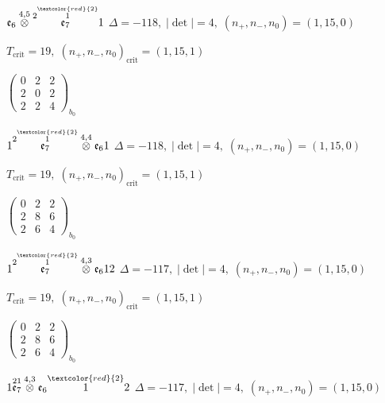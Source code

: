 \documentclass[10pt]{article}
\begin{document}
$\mathfrak{e}_6\overset{4,5}{\otimes}\overset{2\overset{\textcolor{red}{2}}{1}}{\mathfrak{e}_7}1$ \quad $\Delta=-118,\; |\det|=4,\; (n_+,n_-,n_0)=(1,15,0)$

\hspace{1em}$T_{\text{crit}}=19,\; (n_+,n_-,n_0)_{\text{crit}}=(1,15,1)$

\hspace{2em}$\left(\begin{smallmatrix}0 & 2 & 2 \\ 2 & 0 & 2 \\ 2 & 2 & 4\end{smallmatrix}\right)_{\!b_0}$

\smallskip

$1\overset{2\overset{\textcolor{red}{2}}{1}}{\mathfrak{e}_7}\overset{4,4}{\otimes}\mathfrak{e}_61$ \quad $\Delta=-118,\; |\det|=4,\; (n_+,n_-,n_0)=(1,15,0)$

\hspace{1em}$T_{\text{crit}}=19,\; (n_+,n_-,n_0)_{\text{crit}}=(1,15,1)$

\hspace{2em}$\left(\begin{smallmatrix}0 & 2 & 2 \\ 2 & 8 & 6 \\ 2 & 6 & 4\end{smallmatrix}\right)_{\!b_0}$

\smallskip

$1\overset{2\overset{\textcolor{red}{2}}{1}}{\mathfrak{e}_7}\overset{4,3}{\otimes}\mathfrak{e}_612$ \quad $\Delta=-117,\; |\det|=4,\; (n_+,n_-,n_0)=(1,15,0)$

\hspace{1em}$T_{\text{crit}}=19,\; (n_+,n_-,n_0)_{\text{crit}}=(1,15,1)$

\hspace{2em}$\left(\begin{smallmatrix}0 & 2 & 2 \\ 2 & 8 & 6 \\ 2 & 6 & 4\end{smallmatrix}\right)_{\!b_0}$

$1\overset{21}{\mathfrak{e}_7}\overset{4,3}{\otimes}\mathfrak{e}_6\overset{\textcolor{red}{2}}{1}2$ \quad $\Delta=-117,\; |\det|=4,\; (n_+,n_-,n_0)=(1,15,0)$
\end{document}
